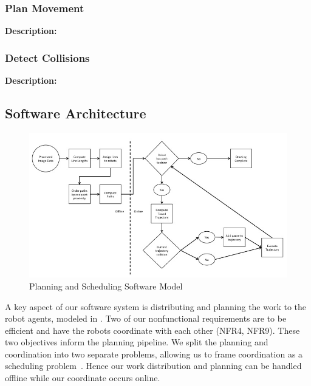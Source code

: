 \subsubsection{Plan Movement}
\textbf{Description:} 

\subsubsection{Detect Collisions}
\textbf{Description:} 

\subsection{Software Architecture}
\label{sec:sw_arch_planner}

\begin{figure}[h!]
 \centering
  \includegraphics[width=0.99\columnwidth]{diagrams/sw_arch_planning.jpg}
	\caption{Planning and Scheduling Software Model}
 \label{fig:planning_processing}
\end{figure}

A key aspect of our software system is distributing and planning the work to the robot agents, modeled in .
Two of our nonfunctional requirements are to be efficient and have the robots coordinate with each other (NFR4, NFR9). These two objectives inform the planning pipeline. We split the planning and coordination into two separate problems, allowing us to frame coordination as a scheduling problem~\cite{o1989deadlock}. Hence our work distribution and planning can be handled offline while our coordinate occurs online.

